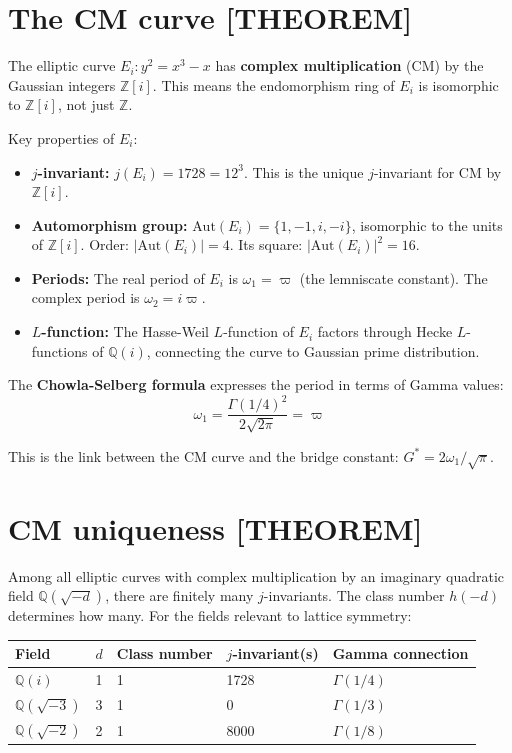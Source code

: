 \documentclass[
  11pt,
  letterpaper,
  twoside,
  openany]{book}
\makeatletter
\providecommand{\tightlist}{%
  \setlength{\itemsep}{0pt}\setlength{\parskip}{0pt}}
\let\orig@section\section
\renewcommand{\section}{\needspace{8\baselineskip}\orig@section}
\newcommand{\Gs}{G^{*}{}}
\makeatother
\begin{document}
\section{The CM curve {[}THEOREM{]}}\label{the-cm-curve-theorem}

The elliptic curve \(E_i: y^2 = x^3 - x\) has \textbf{complex
multiplication} (CM) by the Gaussian integers \(\mathbb{Z}[i]\). This
means the endomorphism ring of \(E_i\) is isomorphic to
\(\mathbb{Z}[i]\), not just \(\mathbb{Z}\).

Key properties of \(E_i\):

\begin{itemize}
\tightlist
\item
  \textbf{\(j\)-invariant:} \(j(E_i) = 1728 = 12^3\). This is the unique
  \(j\)-invariant for CM by \(\mathbb{Z}[i]\).
\item
  \textbf{Automorphism group:} \(\text{Aut}(E_i) = \{1, -1, i, -i\}\),
  isomorphic to the units of \(\mathbb{Z}[i]\). Order:
  \(|\text{Aut}(E_i)| = 4\). Its square: \(|\text{Aut}(E_i)|^2 = 16\).
\item
  \textbf{Periods:} The real period of \(E_i\) is \(\omega_1 = \varpi\)
  (the lemniscate constant). The complex period is
  \(\omega_2 = i\varpi\).
\item
  \textbf{\(L\)-function:} The Hasse-Weil \(L\)-function of \(E_i\)
  factors through Hecke \(L\)-functions of \(\mathbb{Q}(i)\), connecting
  the curve to Gaussian prime distribution.
\end{itemize}

The \textbf{Chowla-Selberg formula} expresses the period in terms of
Gamma values: \[
\omega_1 = \frac{\Gamma(1/4)^2}{2\sqrt{2\pi}} = \varpi
\tag{7.4}
\]

This is the link between the CM curve and the bridge constant:
\(\Gs = 2\omega_1/\sqrt{\pi}\).

\section{CM uniqueness {[}THEOREM{]}}\label{cm-uniqueness-theorem}

Among all elliptic curves with complex multiplication by an imaginary
quadratic field \(\mathbb{Q}(\sqrt{-d})\), there are finitely many
\(j\)-invariants. The class number \(h(-d)\) determines how many. For
the fields relevant to lattice symmetry:

\begin{longtable}[]{@{}lllll@{}}
\toprule\noalign{}
Field & \(d\) & Class number & \(j\)-invariant(s) & Gamma connection \\
\midrule\noalign{}
\endhead
\bottomrule\noalign{}
\endlastfoot
\(\mathbb{Q}(i)\) & 1 & 1 & 1728 & \(\Gamma(1/4)\) \\
\(\mathbb{Q}(\sqrt{-3})\) & 3 & 1 & 0 & \(\Gamma(1/3)\) \\
\(\mathbb{Q}(\sqrt{-2})\) & 2 & 1 & 8000 & \(\Gamma(1/8)\) \\
\end{longtable}
\end{document}

